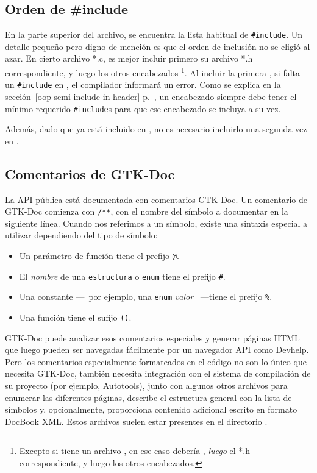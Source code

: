 \subsection{Orden de \#include}
En la parte superior del archivo, se encuentra la lista habitual de \lstinline{#include}. Un detalle pequeño pero digno de mención es que el orden de inclusión no se eligió al azar. En cierto archivo *.c, es mejor incluir primero su archivo *.h correspondiente, y luego los otros encabezados \footnote{Excepto si tiene un archivo , en ese caso debería , \emph{luego} el *.h correspondiente, y luego los otros encabezados.}. Al incluir la primera , si falta un \lstinline{#include} en , el compilador informará un error. Como se explica en la sección~\ref{oop-semi-include-in-header} p.~\pageref{oop-semi-include-in-header}, un encabezado siempre debe tener el mínimo requerido \lstinline{#include}s para que ese encabezado se incluya a su vez.

Además, dado que  ya está incluido en , no es necesario incluirlo una segunda vez en .

\subsection{Comentarios de GTK-Doc}
La API pública está documentada con comentarios GTK-Doc. Un comentario de GTK-Doc comienza con \lstinline{/**}, con el nombre del símbolo a documentar en la siguiente línea. Cuando nos referimos a un símbolo, existe una sintaxis especial a utilizar dependiendo del tipo de símbolo:
\begin{itemize}
    \item Un parámetro de función tiene el prefijo \lstinline{@}.
    \item El \emph{nombre} de una \lstinline{estructura} o \lstinline{enum} tiene el prefijo \lstinline{#}.
    \item Una constante ---~por ejemplo, una \lstinline{enum} \emph{valor} ~---tiene el prefijo \lstinline{%}.
    \item Una función tiene el sufijo \lstinline{()}.
\end{itemize}

GTK-Doc puede analizar esos comentarios especiales y generar páginas HTML que luego pueden ser navegadas fácilmente por un navegador API como Devhelp. Pero los comentarios especialmente formateados en el código no son lo único que necesita GTK-Doc, también necesita integración con el sistema de compilación de su proyecto (por ejemplo, Autotools), junto con algunos otros archivos para enumerar las diferentes páginas, describe el estructura general con la lista de símbolos y, opcionalmente, proporciona contenido adicional escrito en formato DocBook XML. Estos archivos suelen estar presentes en el directorio .

